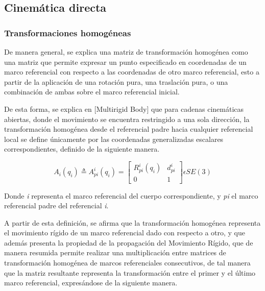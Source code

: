 \subsection{Cinemática directa}
    \subsubsection{Transformaciones homogéneas}
        De manera general, se explica una matriz de transformación homogénea como una
        matriz que permite expresar un punto especificado en coordenadas de
        un marco referencial con respecto a las coordenadas de otro marco 
        referencial, esto a partir de la aplicación de una rotación pura, 
        una traslación pura, o una combinación de ambas sobre el marco referencial
        inicial.

        De esta forma, se explica en [Multirigid Body] que para cadenas cinemáticas abiertas, 
        donde el movimiento se encuentra restringido a una sola dirección, la 
        transformación homogénea desde el referencial padre hacia cualquier referencial 
        local se define únicamente por las coordenadas generalizadas escalares 
        correspondientes, definido de la siguiente manera.

        \begin{equation*} 
            A_i(q_i) \triangleq A^i_{pi}(q_i) =
            \begin{bmatrix}
                R^i_{pi}(q_i) & d^i_{pi}\\
                0 & 1
            \end{bmatrix}
            \epsilon SE(3)
        \end{equation*}

        Donde \emph{i} representa el marco referencial del cuerpo
        correspondiente, y \emph{pi} el marco referencial padre del 
        referencial \emph{i}.

        A partir de esta definición, se afirma que la transformación homogénea representa
        el movimiento rígido de un marco referencial dado con respecto a otro, y que además 
        presenta la propiedad de la propagación del Movimiento Rígido, que de manera resumida 
        permite realizar una multiplicación entre matrices de transformación homogénea de 
        marcos referenciales consecutivos, de tal manera que la matriz resultante representa 
        la transformación entre el primer y el último marco referencial, expresándose de la 
        siguiente manera.

